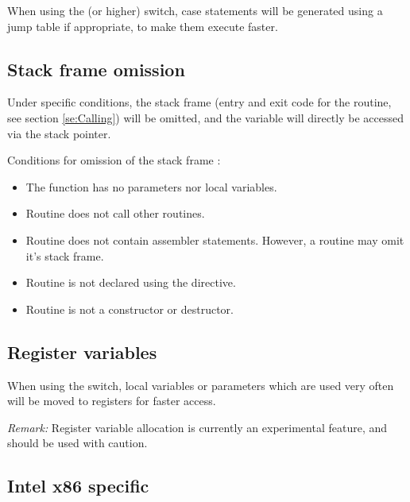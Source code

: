 \documentclass{report}
\begin{document}
When using the  (or higher) switch, case statements will be
generated using a jump table if appropriate, to make them execute
faster.

\subsection{ Stack frame omission }

Under specific conditions, the stack frame (entry and exit code for
the routine, see section \ref{se:Calling}) will be omitted, and the
variable will directly be accessed via the stack pointer.

Conditions for omission of the stack frame :

\begin{itemize}
\item The function has no parameters nor local variables.
\item Routine does not call other routines.
\item Routine does not contain assembler statements. However,
a  routine may omit it's stack frame.
\item Routine is not declared using the  directive.
\item Routine is not a constructor or destructor.
\end{itemize}

\subsection{ Register variables }

When using the  switch, local variables or parameters
which are used very often will be moved to registers for faster
access.

\emph{ Remark: } Register variable allocation is currently
an experimental feature, and should be used with caution.

\subsection{ Intel x86 specific }
\end{document}
